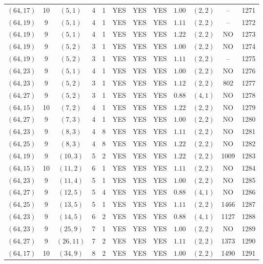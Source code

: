 \begin{longtable}{|c|c|c|c|c|c|c|c|c|c|c|c|}
$(64,17)$ & 10 & $(5,1)$ & 4 & 1 & YES & YES & YES & $1.00$ & $(2,2)$ & -- & 1271\\
$(64,19)$ & 9 & $(5,1)$ & 4 & 1 & YES & YES & YES & $1.11$ & $(2,2)$ & -- & 1272\\
$(64,19)$ & 9 & $(5,1)$ & 4 & 1 & YES & YES & YES & $1.22$ & $(2,2)$ & NO & 1273\\
$(64,19)$ & 9 & $(5,2)$ & 3 & 1 & YES & YES & YES & $1.00$ & $(2,2)$ & NO & 1274\\
$(64,19)$ & 9 & $(5,2)$ & 3 & 1 & YES & YES & YES & $1.11$ & $(2,2)$ & -- & 1275\\
$(64,23)$ & 9 & $(5,1)$ & 4 & 1 & YES & YES & YES & $1.00$ & $(2,2)$ & NO & 1276\\
$(64,23)$ & 9 & $(5,2)$ & 3 & 1 & YES & YES & YES & $1.12$ & $(2,2)$ & 802 & 1277\\
$(64,27)$ & 9 & $(5,2)$ & 3 & 1 & YES & YES & YES & $0.88$ & $(4,1)$ & NO & 1278\\
$(64,15)$ & 10 & $(7,2)$ & 4 & 1 & YES & YES & YES & $1.22$ & $(2,2)$ & NO & 1279\\
$(64,27)$ & 9 & $(7,3)$ & 4 & 1 & YES & YES & YES & $1.00$ & $(2,2)$ & NO & 1280\\
$(64,23)$ & 9 & $(8,3)$ & 4 & 8 & YES & YES & YES & $1.11$ & $(2,2)$ & NO & 1281\\
$(64,25)$ & 9 & $(8,3)$ & 4 & 8 & YES & YES & YES & $1.22$ & $(2,2)$ & NO & 1282\\
$(64,19)$ & 9 & $(10,3)$ & 5 & 2 & YES & YES & YES & $1.22$ & $(2,2)$ & 1009 & 1283\\
$(64,15)$ & 10 & $(11,2)$ & 6 & 1 & YES & YES & YES & $1.11$ & $(2,2)$ & NO & 1284\\
$(64,23)$ & 9 & $(11,4)$ & 5 & 1 & YES & YES & YES & $1.00$ & $(2,2)$ & NO & 1285\\
$(64,27)$ & 9 & $(12,5)$ & 5 & 4 & YES & YES & YES & $0.88$ & $(4,1)$ & NO & 1286\\
$(64,25)$ & 9 & $(13,5)$ & 5 & 1 & YES & YES & YES & $1.11$ & $(2,2)$ & 1466 & 1287\\
$(64,23)$ & 9 & $(14,5)$ & 6 & 2 & YES & YES & YES & $0.88$ & $(4,1)$ & 1127 & 1288\\
$(64,23)$ & 9 & $(25,9)$ & 7 & 1 & YES & YES & YES & $1.00$ & $(2,2)$ & NO & 1289\\
$(64,27)$ & 9 & $(26,11)$ & 7 & 2 & YES & YES & YES & $1.11$ & $(2,2)$ & 1373 & 1290\\
$(64,17)$ & 10 & $(34,9)$ & 8 & 2 & YES & YES & YES & $1.00$ & $(2,2)$ & 1490 & 1291\\

\end{longtable}
